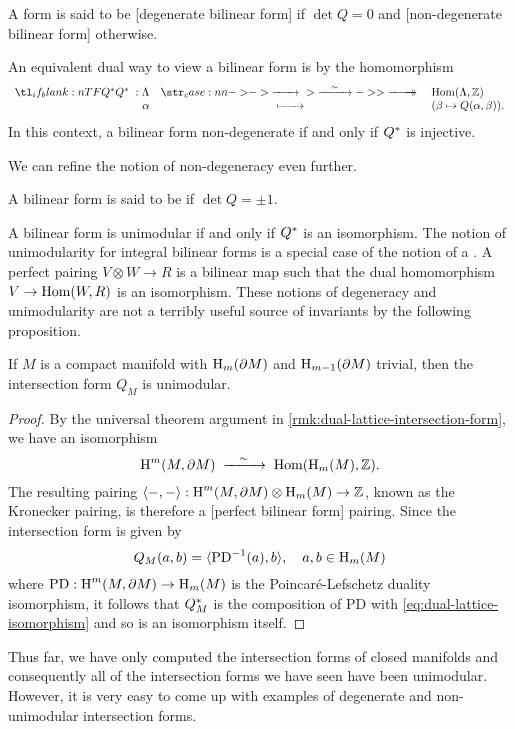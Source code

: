\begin{definition}
	A form is said to be [degenerate bilinear form] if $\det Q=0$ and [non-degenerate bilinear form] otherwise.
\end{definition}

An equivalent dual way to view a bilinear form is by the homomorphism
\[
	\lkxfunc{Q^\d}{\Lambda}{\Hom(\Lambda, \Z)}{\alpha}{(\beta\mapsto Q(\alpha,\beta)).}
\]
In this context, a bilinear form non-degenerate if and only if $Q^*$ is injective.

We can refine the notion of non-degeneracy even further.
\begin{definition}
	A bilinear form is said to be  if $\det Q=\pm 1$.
\end{definition}
A bilinear form is unimodular if and only if $Q^*$ is an isomorphism. The notion of unimodularity for integral bilinear forms is a special case of the notion of a . A perfect pairing $V\otimes W \to R$ is a bilinear map such that the dual homomorphism $V \to \operatorname{Hom}(W, R)$ is an isomorphism. These notions of degeneracy and unimodularity are not a terribly useful source of invariants by the following proposition.

\begin{proposition}\label{prop:unimodular-intersection-form}
	If $M$ is a compact manifold with $\operatorname{H}_m(\partial M)$ and $\operatorname{H}_{m-1}(\partial M)$ trivial, then the intersection form $Q_M$ is unimodular.
\end{proposition}
\begin{proof}
	By the universal theorem argument in \cref{rmk:dual-lattice-intersection-form}, we have an isomorphism
	\begin{equation}\label{eq:dual-lattice-isomorphism}
		\H^m(M,\partial M) \lkxisom \Hom(\H_m(M), \Z).
	\end{equation}
	The resulting pairing $\langle -, -\rangle : \operatorname{H}^m(M,\partial M)\otimes \operatorname{H}_m(M) \to \mathbb{Z}$, known as the Kronecker pairing, is therefore a [perfect bilinear form] pairing. Since the intersection form is given by
	\[
		Q_M(a,b) = \langle \mathrm{PD}^{-1}(a), b\rangle,\quad a,b\in \operatorname{H}_m(M)
	\]
	where $\mathrm{PD} : \operatorname{H}^{m}(M,\partial M) \to \operatorname{H}_m(M)$ is the Poincar\'e-Lefschetz duality isomorphism, it follows that $Q_M^*$ is the composition of $\mathrm{PD}$ with \cref{eq:dual-lattice-isomorphism} and so is an isomorphism itself.
\end{proof}

Thus far, we have only computed the intersection forms of closed manifolds and consequently all of the intersection forms we have seen have been unimodular. However, it is very easy to come up with examples of degenerate and non-unimodular intersection forms.

